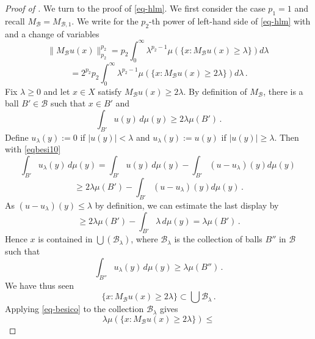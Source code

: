 \begin{proof}[Proof of ]
We turn to the proof of \eqref{eq-hlm}. We first consider the case $p_1=1$ and recall $M_{\mathcal{B}}=M_{\mathcal{B},1}$.
We write for the $p_2$-th power of left-hand side of \eqref{eq-hlm}
with 
and a change of variables
\begin{equation}
    \|M_{\mathcal{B}}u(x)\|_{p_2}^{p_2}
   =p_2\int _0^{\infty}
    \lambda^{p_2-1} \mu(\{x: M_{\mathcal{B}}u(x)\ge \lambda\}) d\lambda\,
\end{equation}
\begin{equation} \label{eqbesi11}
   =2^{p_2} p_2\int _0^{\infty}
    \lambda^{p_2-1} \mu(\{x: M_{\mathcal{B}}u(x)\ge 2\lambda\}) d\lambda\, .
\end{equation}
Fix $\lambda\ge 0$ and let $x\in X$ satisfy $M_{\mathcal{B}}u(x)\ge 2\lambda$. By definition of $M_{\mathcal{B}}$, there is a ball
$B'\in \mathcal{B}$ such that
$x\in B'$ and
\begin{equation}\label{eqbesi10}
\int_{B'} u(y)\, d\mu(y)\ge 2\lambda \mu({B'}) \, .
\end{equation}
Define
$u_\lambda(y):=0$ if $|u(y)|<\lambda$ and $u_\lambda(y):=u(y)$ if $|u(y)|\ge \lambda$.
Then with \eqref{eqbesi10}
\begin{equation}
\int_{B'} u_\lambda (y)\, d\mu(y)
=\int_{B'} u (y)\, d\mu(y)-
\int_{B'} (u-u_\lambda) (y) d\mu(y)\,
\end{equation}
\begin{equation}
\ge 2\lambda \mu({B'})-
\int_{B'} (u-u_\lambda) (y) d\mu(y)\, .
\end{equation}
As $(u-u_\lambda)(y)\le \lambda$
by definition, we can estimate the last display by
\begin{equation}
\ge 2\lambda \mu({B'})-
\int_{B'} \lambda \, d\mu(y)
=\lambda \mu({B'})\, .
\end{equation}
Hence $x$ is contained in
$\bigcup(\mathcal{B}_\lambda)$,
where $\mathcal{B}_\lambda$
is the collection of balls $B''$ in $\mathcal{B}$ such that
\begin{equation}
    \int_{B''} u_\lambda (y)\, d\mu(y)\ge \lambda \mu(B'')\, .
\end{equation}
We have thus seen
\begin{equation}
    \{x: M_{\mathcal{B}}u(x)\ge 2\lambda\}\subset
    \bigcup \mathcal{B}_\lambda
\, .
\end{equation}
Applying \eqref{eq-besico} to the collection $\mathcal{B}_\lambda$
gives
\begin{equation}
    \lambda \mu(\{x: M_{\mathcal{B}}u(x)\ge 2\lambda\})\le

\end{equation}
\end{proof}
